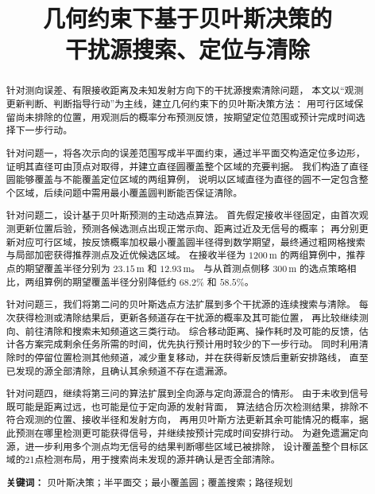 \documentclass[UTF8,a4paper,12pt]{ctexart}
\title{\textbf{几何约束下基于贝叶斯决策的\\干扰源搜索、定位与清除}}
\author{}
\date{}
\begin{document}
\maketitle

\begin{abstract}
针对测向误差、有限接收距离及未知发射方向下的干扰源搜索清除问题，
本文以“观测更新判断、判断指导行动”为主线，建立几何约束下的贝叶斯决策方法：
用可行区域保留尚未排除的位置，用观测后的概率分布预测反馈，按期望定位范围或预计完成时间选择下一步行动。

针对问题一，将各次示向的误差范围写成半平面约束，通过半平面交构造定位多边形，
证明其直径可由顶点对取得，并建立直径圆覆盖整个区域的充要判据。
我们构造了直径圆能够覆盖与不能覆盖定位区域的两组算例，
说明以区域直径为直径的圆不一定包含整个区域，后续问题中需用最小覆盖圆判断能否保证清除。

针对问题二，设计基于贝叶斯预测的主动选点算法。
首先假定接收半径固定，由首次观测更新位置后验，预测各候选测点出现正常示向、距离过近及无信号的概率；
再分别更新对应可行区域，按反馈概率加权最小覆盖圆半径得到数学期望，最终通过粗网格搜索与局部加密获得推荐测点及近优候选区域。
在接收半径为 $1200\,\mathrm m$ 的两组算例中，推荐点的期望覆盖半径分别为 $23.15\,\mathrm m$ 和 $12.93\,\mathrm m$。
与从首测点侧移 $300\,\mathrm m$ 的选点策略相比，两组算例的期望覆盖半径分别降低约 $68.2\%$ 和 $58.5\%$。

针对问题三，我们将第二问的贝叶斯选点方法扩展到多个干扰源的连续搜索与清除。
每次获得检测或清除结果后，更新各频道存在干扰源的概率及其可能位置，
再比较继续测向、前往清除和搜索未知频道这三类行动。
综合移动距离、操作耗时及可能的反馈，估计各方案完成剩余任务所需的时间，优先执行预计用时较少的下一步行动。
同时利用清除时的停留位置检测其他频道，减少重复移动，并在获得新反馈后重新安排路线，
直至已发现的源全部清除，且确认其余频道不存在遗漏源。

针对问题四，继续将第三问的算法扩展到全向源与定向源混合的情形。
由于未收到信号既可能是距离过远，也可能是位于定向源的发射背面，
算法结合历次检测结果，排除不符合观测的位置、接收半径和发射方向，
再用贝叶斯方法更新其余可能情况的概率，据此预测在哪里检测更可能获得信号，并继续按预计完成时间安排行动。
为避免遗漏定向源，进一步利用多个测点均无信号的结果判断哪些区域已被排除，
设计覆盖整个目标区域的21点检测布局，用于搜索尚未发现的源并确认是否全部清除。

\textbf{关键词：} 贝叶斯决策；半平面交；最小覆盖圆；覆盖搜索；路径规划
\end{abstract}


\newpage
\end{document}

